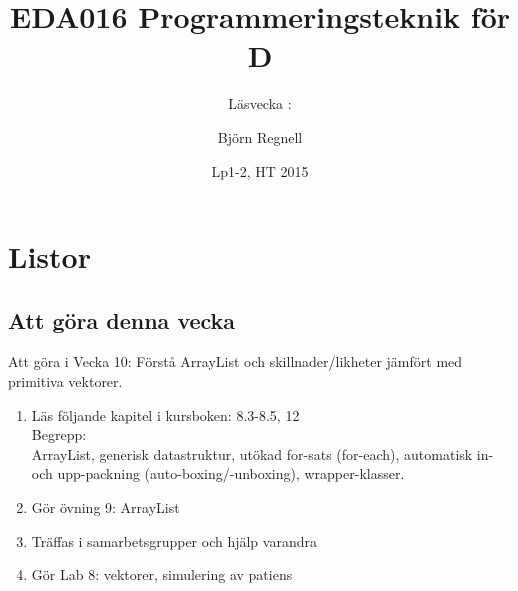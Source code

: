 \documentclass{lecturenotes}
\title[Föreläsningsanteckningar EDA016, 2015]{EDA016 Programmeringsteknik för D}
\subtitle{Läsvecka \vecka: \tema}
\author{Björn Regnell}
\institute{Datavetenskap, LTH}
\date{Lp1-2, HT 2015}
\renewcommand{\vecka}{10}
\newcommand{\tema}{Listor}
\begin{document}
\frame{\titlepage}
\setnextsection{\vecka}
\section[Vecka \vecka: \tema]{\tema}
\frame{\tableofcontents}

\subsection{Att göra denna vecka}
\begin{Slide}{Att göra i Vecka \vecka: Förstå ArrayList och skillnader/likheter jämfört med primitiva vektorer.}
\begin{enumerate}
\item Läs följande kapitel i kursboken:  8.3-8.5, 12 \\  
Begrepp: \\ArrayList, generisk datastruktur, utökad for-sats (for-each), automatisk in- och upp-packning (auto-boxing/-unboxing), wrapper-klasser.
\item Gör övning 9: ArrayList
\item Träffas i samarbetsgrupper och hjälp varandra 
\item Gör Lab 8: vektorer, simulering av patiens
\end{enumerate}
\end{Slide}
\end{document}

